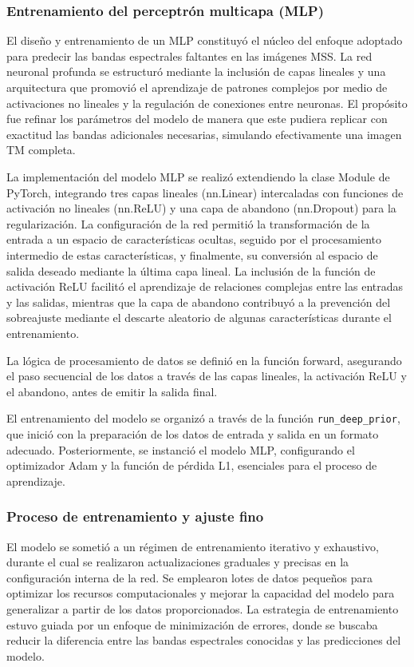             \subsubsection{Entrenamiento del perceptrón multicapa (MLP)}
                El diseño y entrenamiento de un MLP constituyó el núcleo del enfoque adoptado para predecir las bandas espectrales faltantes en las imágenes MSS. La red neuronal profunda se estructuró mediante la inclusión de capas lineales y una arquitectura que promovió el aprendizaje de patrones complejos por medio de activaciones no lineales y la regulación de conexiones entre neuronas. El propósito fue refinar los parámetros del modelo de manera que este pudiera replicar con exactitud las bandas adicionales necesarias, simulando efectivamente una imagen TM completa.

                La implementación del modelo MLP se realizó extendiendo la clase Module de PyTorch, integrando tres capas lineales (nn.Linear) intercaladas con funciones de activación no lineales (nn.ReLU) y una capa de abandono (nn.Dropout) para la regularización. La configuración de la red permitió la transformación de la entrada a un espacio de características ocultas, seguido por el procesamiento intermedio de estas características, y finalmente, su conversión al espacio de salida deseado mediante la última capa lineal. La inclusión de la función de activación ReLU facilitó el aprendizaje de relaciones complejas entre las entradas y las salidas, mientras que la capa de abandono contribuyó a la prevención del sobreajuste mediante el descarte aleatorio de algunas características durante el entrenamiento.
                
                La lógica de procesamiento de datos se definió en la función forward, asegurando el paso secuencial de los datos a través de las capas lineales, la activación ReLU y el abandono, antes de emitir la salida final.
                
                El entrenamiento del modelo se organizó a través de la función \texttt{run\_deep\_prior}, que inició con la preparación de los datos de entrada y salida en un formato adecuado. Posteriormente, se instanció el modelo MLP, configurando el optimizador Adam y la función de pérdida L1, esenciales para el proceso de aprendizaje.

            \subsubsection{Proceso de entrenamiento y ajuste fino}
                El modelo se sometió a un régimen de entrenamiento iterativo y exhaustivo, durante el cual se realizaron actualizaciones graduales y precisas en la configuración interna de la red. Se emplearon lotes de datos pequeños para optimizar los recursos computacionales y mejorar la capacidad del modelo para generalizar a partir de los datos proporcionados. La estrategia de entrenamiento estuvo guiada por un enfoque de minimización de errores, donde se buscaba reducir la diferencia entre las bandas espectrales conocidas y las predicciones del modelo.

